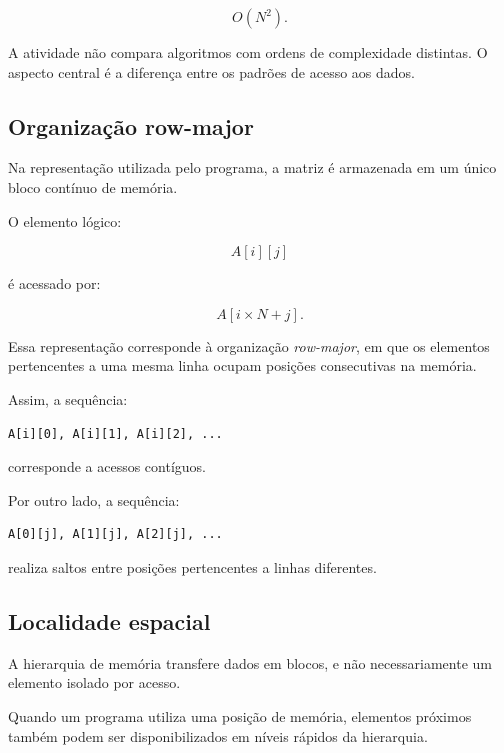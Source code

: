 \begin{equation}
    O(N^2).
\end{equation}

A atividade não compara algoritmos com ordens de complexidade distintas.
O aspecto central é a diferença entre os padrões de acesso aos dados.


\subsection{Organização row-major}

Na representação utilizada pelo programa, a matriz é armazenada em um
único bloco contínuo de memória.

O elemento lógico:

\begin{equation}
    A[i][j]
\end{equation}

é acessado por:

\begin{equation}
    A[i \times N + j].
    \label{eq:atvd01-rowmajor}
\end{equation}

Essa representação corresponde à organização \textit{row-major}, em que
os elementos pertencentes a uma mesma linha ocupam posições consecutivas
na memória.

Assim, a sequência:

\begin{verbatim}
A[i][0], A[i][1], A[i][2], ...
\end{verbatim}

corresponde a acessos contíguos.

Por outro lado, a sequência:

\begin{verbatim}
A[0][j], A[1][j], A[2][j], ...
\end{verbatim}

realiza saltos entre posições pertencentes a linhas diferentes.


\subsection{Localidade espacial}

A hierarquia de memória transfere dados em blocos, e não necessariamente
um elemento isolado por acesso.

Quando um programa utiliza uma posição de memória, elementos próximos
também podem ser disponibilizados em níveis rápidos da hierarquia.

